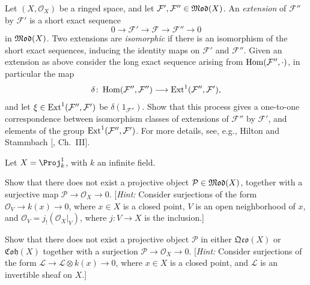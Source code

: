 {\Exercises
{\fontsize{9}{10.4}\selectfont\setlength{\parskip}{0pt}
\begin{description}[style=multiline,labelwidth=1.82em,leftmargin=2.15em,itemsep=4pt,topsep=0pt,parsep=0pt]
\item[\hypertarget{ex-III-6.1}{}6.1.] Let $(X,\mathcal O_X)$ be a ringed space, and let $\mathcal F',\mathcal F''\in\operatorname{\mathfrak{Mod}}(X)$. An \emph{extension} of $\mathcal F''$ by $\mathcal F'$ is a short exact sequence
\[
0\longrightarrow\mathcal F'\longrightarrow\mathcal F\longrightarrow\mathcal F''\longrightarrow0
\]
in $\operatorname{\mathfrak{Mod}}(X)$. Two extensions are \emph{isomorphic} if there is an isomorphism of the short exact sequences, inducing the identity maps on $\mathcal F'$ and $\mathcal F''$. Given an extension as above consider the long exact sequence arising from $\operatorname{Hom}(\mathcal F'',\cdot)$, in particular the map
\[
\delta\colon\operatorname{Hom}(\mathcal F'',\mathcal F'')\longrightarrow\operatorname{Ext}^1(\mathcal F'',\mathcal F'),
\]
and let $\xi\in\operatorname{Ext}^1(\mathcal F'',\mathcal F')$ be $\delta(1_{\mathcal F''})$. Show that this process gives a one-to-one correspondence between isomorphism classes of extensions of $\mathcal F''$ by $\mathcal F'$, and elements of the group $\operatorname{Ext}^1(\mathcal F'',\mathcal F')$. For more details, see, e.g., Hilton and Stammbach [, Ch.~III].
\item[\hypertarget{ex-III-6.2}{}6.2.] Let $X=\Proj_k^1$, with $k$ an infinite field.
\begin{parts}
\item Show that there does not exist a projective object $\mathcal P\in\operatorname{\mathfrak{Mod}}(X)$, together with a surjective map $\mathcal P\to\mathcal O_X\to0$. [\emph{Hint:} Consider surjections of the form $\mathcal O_V\to k(x)\to0$, where $x\in X$ is a closed point, $V$ is an open neighborhood of $x$, and $\mathcal O_V=j_!(\mathcal O_X|_V)$, where $j\colon V\to X$ is the inclusion.]
\item Show that there does not exist a projective object $\mathcal P$ in either $\mathfrak{Qco}(X)$ or $\mathfrak{Coh}(X)$ together with a surjection $\mathcal P\to\mathcal O_X\to0$. [\emph{Hint:} Consider surjections of the form $\mathcal L\to\mathcal L\otimes k(x)\to0$, where $x\in X$ is a closed point, and $\mathcal L$ is an invertible sheaf on $X$.]
\end{parts}
\end{description}
}
}

